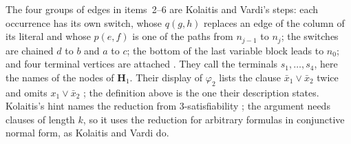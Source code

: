 The four groups of edges in items~2--6 are Kolaitis and Vardi's steps: each
occurrence has its own switch, whose \(q(g,h)\) replaces an edge of the column
of its literal and whose \(p(e,f)\) is one of the paths from \(n_{j-1}\) to
\(n_j\); the switches are chained \(d\) to \(b\) and \(a\) to \(c\); the
bottom of the last variable block leads to \(n_0\); and four terminal
vertices are attached \cite[pp.~30--31]{KolaitisVardi1995DatalogManuscript}.
They call the terminals \(s_1,\ldots,s_4\), here the names of the nodes of
\(\mathbf H_1\). Their display of \(\varphi_2\) lists the clause
\(\bar x_1\vee\bar x_2\) twice and omits \(x_1\vee\bar x_2\)
\cite[p.~34]{KolaitisVardi1995DatalogManuscript}; the definition above is the
one their description states. Kolaitis's hint names the reduction from
3-satisfiability \cite[p.~79]{Kolaitis2003ExpressivePowerNotes}; the
argument needs clauses of length \(k\), so it uses the reduction for
arbitrary formulas in conjunctive normal form, as Kolaitis and Vardi do.

